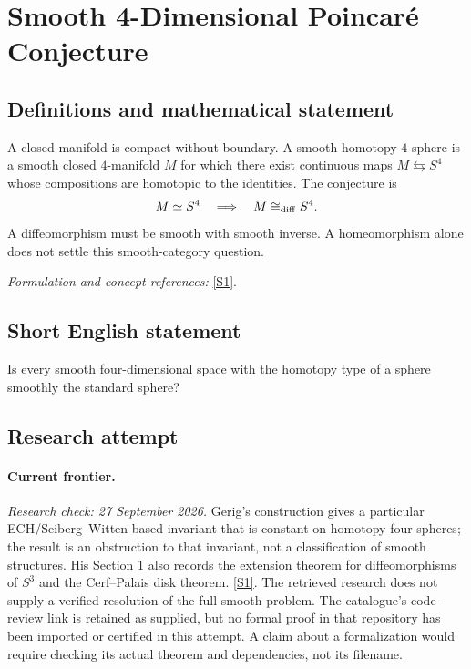 \documentclass[11pt,a4paper]{article}
\newcommand{\sref}[2]{\hyperlink{source:#1:#2}{[S#2]}}
\newif\ifshowcatalogue
\newcommand{\cataloguescope}[1]{\ifshowcatalogue
 \paragraph{Exact scope in the supplied catalogue.}
 \begin{quote}\small #1\end{quote}\fi}
\begin{document}
\setcounter{section}{0}
\clearpage
\section*{\texorpdfstring{Smooth 4-Dimensional Poincaré Conjecture}{Smooth 4-Dimensional Poincaré Conjecture}}\label{18}
\subsection{Definitions and mathematical statement}
A closed manifold is compact without boundary. A smooth homotopy $4$-sphere is a smooth closed $4$-manifold $M$ for which there exist continuous maps $M\leftrightarrows S^4$ whose compositions are homotopic to the identities. The conjecture is
\[
 M\simeq S^4\quad\Longrightarrow\quad M\cong_{\rm diff} S^4.
\]
A diffeomorphism must be smooth with smooth inverse. A homeomorphism alone does not settle this smooth-category question.
\par\smallskip\textit{Formulation and concept references:} \sref{18}{1}.
\cataloguescope{Determine whether every smooth closed 4-manifold homotopy equivalent to the standard 4-sphere S\textasciicircum{}4 is diffeomorphic to S\textasciicircum{}4.}
\subsection{Short English statement}
Is every smooth four-dimensional space with the homotopy type of a sphere smoothly the standard sphere?
\subsection{Research attempt}
\paragraph{Current frontier.}
\textit{Research check: 27 September 2026.}
Gerig's construction gives a particular ECH/Seiberg--Witten-based invariant
that is constant on homotopy four-spheres; the result is an obstruction to
that invariant, not a classification of smooth structures. His Section 1
also records the extension theorem for diffeomorphisms of $S^3$ and the
Cerf--Palais disk theorem. \sref{18}{1}.
The retrieved research does not supply a verified resolution of the full
smooth problem. The catalogue's code-review link is retained as supplied,
but no formal proof in that repository has been imported or certified in
this attempt. A claim about a formalization would require checking its
actual theorem and dependencies, not its filename.
\end{document}
